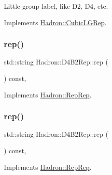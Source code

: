 Little-\/group label, like D2, D4, etc. 

Implements \mbox{\hyperlink{structHadron_1_1CubicLGRep_a9bdb14b519a611d21379ed96a3a9eb41}{Hadron\+::\+Cubic\+L\+G\+Rep}}.

\mbox{\label{structHadron_1_1D4B2Rep_ac78aafe72fe015abb9639b5c380be490}} 
\subsubsection{\texorpdfstring{rep()}{rep()}\hspace{0.1cm}{\footnotesize\ttfamily [1/5]}}
{\footnotesize\ttfamily std\+::string Hadron\+::\+D4\+B2\+Rep\+::rep (\begin{DoxyParamCaption}{ }\end{DoxyParamCaption}) const\hspace{0.3cm}{\ttfamily [inline]}, {\ttfamily [virtual]}}



Implements \mbox{\hyperlink{structHadron_1_1RepRep_ab3213025f6de249f7095892109575fde}{Hadron\+::\+Rep\+Rep}}.

\mbox{\label{structHadron_1_1D4B2Rep_ac78aafe72fe015abb9639b5c380be490}} 
\subsubsection{\texorpdfstring{rep()}{rep()}\hspace{0.1cm}{\footnotesize\ttfamily [2/5]}}
{\footnotesize\ttfamily std\+::string Hadron\+::\+D4\+B2\+Rep\+::rep (\begin{DoxyParamCaption}{ }\end{DoxyParamCaption}) const\hspace{0.3cm}{\ttfamily [inline]}, {\ttfamily [virtual]}}



Implements \mbox{\hyperlink{structHadron_1_1RepRep_ab3213025f6de249f7095892109575fde}{Hadron\+::\+Rep\+Rep}}.

\mbox{\label{structHadron_1_1D4B2Rep_ac78aafe72fe015abb9639b5c380be490}} 

